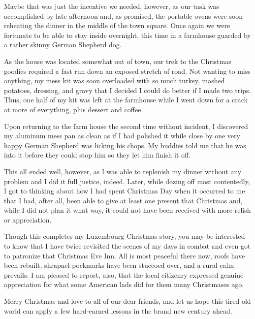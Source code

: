 \documentclass[../m3y]{subfiles}
\begin{document}
Maybe that was just the incentive we needed, however, as our task was accomplished by late afternoon and, as promised, the portable ovens were soon reheating the dinner in the middle of the town square. Once again we were fortunate to be able to stay inside overnight, this time in a farmhouse guarded by a rather skinny German Shepherd dog.

As the house was located somewhat out of town, our trek to the Christmas goodies required a fast run down an exposed stretch of road. Not wanting to miss anything, my mess kit was soon overloaded with so much turkey, mashed potatoes, dressing, and gravy that I decided I could do better if I made two trips. Thus, one half of my kit was left at the farmhouse while I went down for a crack at more of everything, plus dessert and coffee.

Upon returning to the farm house the second time without incident, I discovered my aluminum mess pan as clean as if I had polished it while close by one very happy German Shepherd was licking his chops. My buddies told me that he was into it before they could stop him so they let him finish it off.

This all ended well, however, as I was able to replenish my dinner without any problem and I did it full justice, indeed. Later, while dozing off most contentedly, I got to thinking about how I had spent Christmas Day when it occurred to me that I had, after all, been able to give at least one present that Christmas and, while I did not plan it what way, it could not have been received with more relish or appreciation.

Though this completes my Luxembourg Christmas story, you may be interested to know that I have twice revisited the scenes of my days in combat and even got to patronize that Christmas Eve Inn. All is most peaceful there now, roofs have been rebuilt, shrapnel pockmarks have been stuccoed over, and a rural calm prevails. I am pleased to report, also, that the local citizenry expressed genuine appreciation for what some American lads did for them many Christmases ago.

Merry Christmas and love to all of our dear friends, and let us hope this tired old world can apply a few hard-earned lessons in the brand new century ahead.
\end{document}
